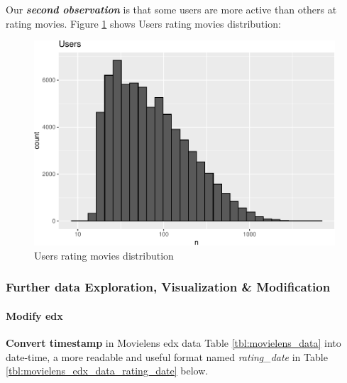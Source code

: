 \documentclass[
]{article}
\begin{document}
\newpage

Our \textbf{\emph{second observation}} is that some users are more
active than others at rating movies. Figure
\ref{fig:users_rating_movies} shows Users rating movies distribution:

\begin{figure}
\centering
\includegraphics{figures/eda_6-1.pdf}
\caption{Users rating movies
distribution\label{fig:users_rating_movies}}
\end{figure}

\newpage

\hypertarget{further-data-exploration-visualization-modification}{%
\subsubsection{Further data Exploration, Visualization \&
Modification}\label{further-data-exploration-visualization-modification}}

\hypertarget{modify_edx}{%
\paragraph{Modify edx}\label{modify_edx}}

\textbf{Convert timestamp} in Movielens edx data Table
\ref{tbl:movielens_data} into date-time, a more readable and useful
format named \emph{rating\_date} in Table
\ref{tbl:movielens_edx_data_rating_date} below.
\end{document}
